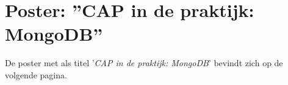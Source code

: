 \chapter{Poster: ''CAP in de praktijk: MongoDB''}\label{sec:poster}
De poster met als titel '\textit{CAP in de praktijk: MongoDB}' bevindt zich op de volgende pagina. 
